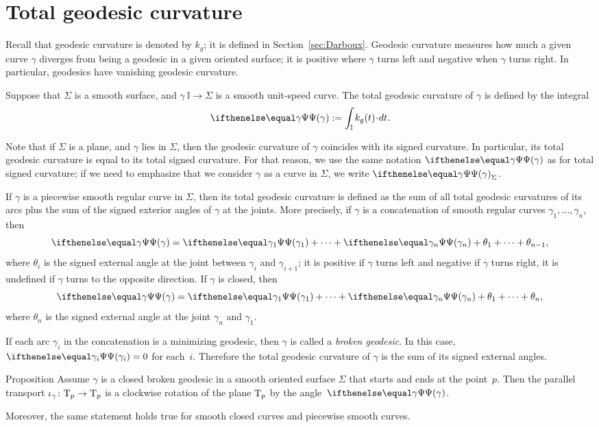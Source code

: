 \section{Total geodesic curvature}

Recall that geodesic curvature is denoted by $k_g$;
it is defined in Section~\ref{sec:Darboux}.
Geodesic curvature measures how much a given curve $\gamma$ diverges from being a geodesic in a given oriented surface;
it is positive where $\gamma$ turns left and negative when $\gamma$ turns right.
In particular, geodesics have vanishing geodesic curvature.

Suppose that $\Sigma$ is a smooth surface, and $\gamma\:\mathbb{I}\to \Sigma$ is a smooth unit-speed curve.
The total geodesic curvature of $\gamma$ is defined by the integral 
\[\tgc\gamma
\df
\int_{\mathbb{I}} k_g(t)\cdot dt.\]

Note that if $\Sigma$ is a plane, and $\gamma$ lies in $\Sigma$, then the geodesic curvature of $\gamma$ coincides
with its signed curvature. 
In particular, its total geodesic curvature is equal to its total signed curvature.
For that reason, we use the same notation $\tgc\gamma$ as for total signed curvature; if we need to emphasize that we consider $\gamma$ as a curve in $\Sigma$, we write $\tgc\gamma_\Sigma$.

If $\gamma$ is a piecewise smooth regular curve in $\Sigma$, then
its total geodesic curvature is defined as the sum of all total geodesic curvatures of its arcs plus the sum of the signed exterior angles of $\gamma$ at the joints.
More precisely, if $\gamma$ is a concatenation of smooth regular curves $\gamma_1,\dots,\gamma_n$, then
\[\tgc\gamma=\tgc{\gamma_1}+\dots+\tgc{\gamma_n}+\theta_1+\dots+\theta_{n-1},\]
where $\theta_i$ is the signed external angle at the joint between $\gamma_i$ and $\gamma_{i+1}$;
it is positive if $\gamma$ turns left and negative if $\gamma$ turns right, it is undefined if $\gamma$ turns to the opposite direction.
If $\gamma$ is closed, then 
\[\tgc\gamma=\tgc{\gamma_1}+\dots+\tgc{\gamma_n}+\theta_1+\dots+\theta_{n},\]
where $\theta_n$ is the signed external angle at the joint $\gamma_n$ and $\gamma_1$.

If each arc $\gamma_i$ in the concatenation is a minimizing geodesic, then $\gamma$ is called a \emph{broken geodesic}.
In this case, $\tgc{\gamma_i}=0$ for each~$i$.
Therefore the total geodesic curvature of $\gamma$ is the sum of its signed external angles.

\begin{thm}{Proposition}\label{prop:pt+tgc}
Assume $\gamma$ is a closed broken geodesic in a smooth oriented surface $\Sigma$ that starts and ends at the point~$p$.
Then the parallel transport $\iota_\gamma\colon\mathrm{T}_p\to\mathrm{T}_p$ is a clockwise rotation of the plane $\mathrm{T}_p$  by the angle~$\tgc\gamma$.

Moreover, the same statement holds true for smooth closed curves and piecewise smooth curves.
\end{thm}

